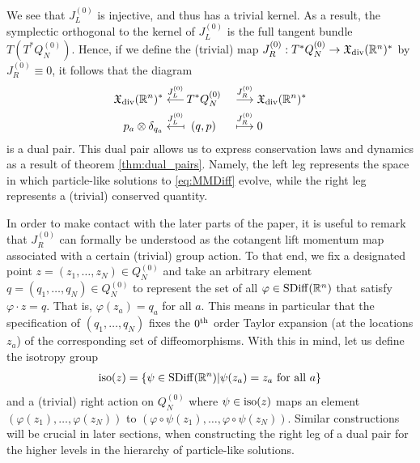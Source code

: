 \documentclass[12pt]{amsart}
\newcommand{\R}{\ensuremath{\mathbb{R}}}
\begin{document}
  We see that $J_L^{(0)}$ is injective, and thus has a trivial kernel. As a result, the symplectic orthogonal to the kernel of $J_L^{(0)}$  is the full tangent bundle $T(T^*Q_N^{(0)})$. Hence, if we define the (trivial) map $J_R^{(0)}: T^*Q^{(0)}_N \to \mathfrak{X}_{\rm div}(\mathbb{R}^n)^*$ by $J_R^{(0)} \equiv 0$, it follows that the diagram
 \begin{alignat*}{2}
    \mathfrak{X}_{\rm div}(\R^n)^* \stackrel{J_L^{(0)} }{\longleftarrow}&
    \,T^* Q_N^{(0)}
    &&\stackrel{J_R^{(0)} }{\longrightarrow} \mathfrak{X}_{\rm div}(\R^n)^* \\
    p_a \otimes \delta_{q_a} \stackrel{J_L^{(0)}}{\longmapsfrom}&
    \;\;(q,p)
    &&\stackrel{J_R^{(0)} }{\longmapsto} 0
  \end{alignat*}
  is a dual pair. 
  This dual pair allows us to express conservation
  laws and dynamics as a result of theorem \ref{thm:dual_pairs}.
   Namely, the left leg represents the space in which particle-like
  solutions to \eqref{eq:MMDiff} evolve,
  while the right leg represents a (trivial) conserved quantity. 
    
  In order to make contact with the later parts of the paper, it is useful to remark that $J_R^{(0)}$ can formally be understood as the cotangent lift momentum map associated with a certain (trivial) group action.
  To that end, we fix a designated point $z = (z_1, \ldots, z_N) \in Q_N^{(0)}$ and take an arbitrary element $ q= (q_1, \ldots, q_N) \in Q_N^{(0)}$ to represent the set of all $\varphi \in {\rm SDiff}(\mathbb{R}^n)$ that satisfy $\varphi \cdot z  = q$.
  That is, $\varphi(z_a) = q_a$ for all $a$.
  This means in particular that the specification of $(q_1, \ldots, q_N)$ fixes the $0^{\rm th}$ order Taylor expansion (at the locations $z_a$) of the corresponding set of diffeomorphisms. With this in mind, let us define the isotropy group
\begin{align}
{\rm iso}(z)  = \{ \psi \in {\rm SDiff}(\mathbb{R}^n) | \psi(z_a) = z_a \mbox{ for all } a\} \label{isotropy_group}
\end{align}
and a (trivial) right action on $Q_N^{(0)}$ where $\psi \in {\rm iso}(z)$ maps an element $(\varphi(z_1), \ldots, \varphi(z_N))$ to $( \varphi \circ \psi (z_1), \ldots, \varphi \circ \psi(z_N))$.
Similar constructions will be crucial in later sections, when constructing the right leg of a dual pair for the higher levels in the hierarchy of particle-like solutions.
\end{document}

